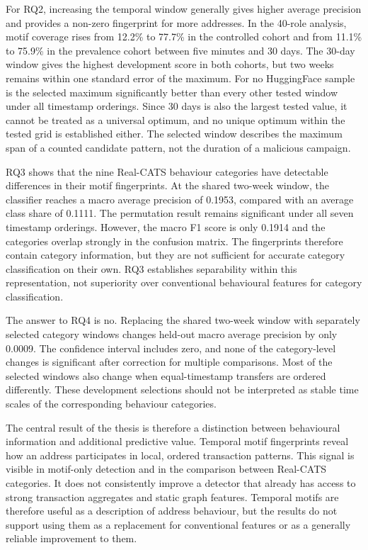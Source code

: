 For RQ2, increasing the temporal window generally gives higher average precision
and provides a non-zero
fingerprint for more addresses. In the 40-role analysis, motif
coverage rises from 12.2\% to 77.7\% in the controlled cohort and from
11.1\% to 75.9\% in the prevalence cohort between five minutes and 30 days.
The 30-day window gives
the highest development score in both cohorts, but two weeks remains within one
standard error of the maximum. For no HuggingFace sample is the selected maximum
significantly better than every other tested window under all timestamp
orderings. Since 30
days is also the largest tested value, it cannot be treated as a universal
optimum, and no unique optimum within the tested grid is established either.
The selected window describes the maximum span of a counted candidate pattern,
not the duration of a malicious
campaign.

RQ3 shows that the nine Real-CATS behaviour categories have detectable
differences in their motif fingerprints. At the shared two-week window, the
classifier reaches a macro average precision of 0.1953, compared with an
average class share of 0.1111. The permutation result remains significant under
all seven timestamp orderings. However, the macro F1 score is only 0.1914 and
the categories overlap strongly in the confusion matrix. The fingerprints
therefore contain category information, but they are not sufficient for
accurate category classification on their own. RQ3 establishes separability
within this representation, not superiority over conventional behavioural
features for category classification.

The answer to RQ4 is no. Replacing the shared two-week window with separately
selected category windows changes held-out macro average precision by only
0.0009. The confidence interval includes zero, and none of the category-level
changes is significant after correction for multiple comparisons. Most of the
selected windows also change when equal-timestamp transfers are ordered
differently. These development selections should not be interpreted as stable
time scales of the corresponding behaviour categories.

The central result of the thesis is therefore a distinction between behavioural
information and additional predictive value. Temporal motif fingerprints reveal
how an address participates in local, ordered transaction patterns. This signal
is visible in motif-only detection and in the comparison between Real-CATS
categories. It does not consistently improve a detector that already has access
to strong transaction aggregates and static graph features. Temporal motifs are
therefore useful as a description of address behaviour, but the results do not
support using them as a replacement for conventional features or as a generally
reliable improvement to them.


